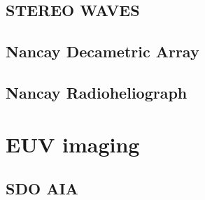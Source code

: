 \subsection{STEREO WAVES}\label{sec:31}

\subsection{Nancay Decametric Array}\label{sec:32}

\subsection{Nancay Radioheliograph}\label{sec:33}



\section{EUV imaging}\label{sec:4}

\subsection{SDO AIA}\label{sec:40}



